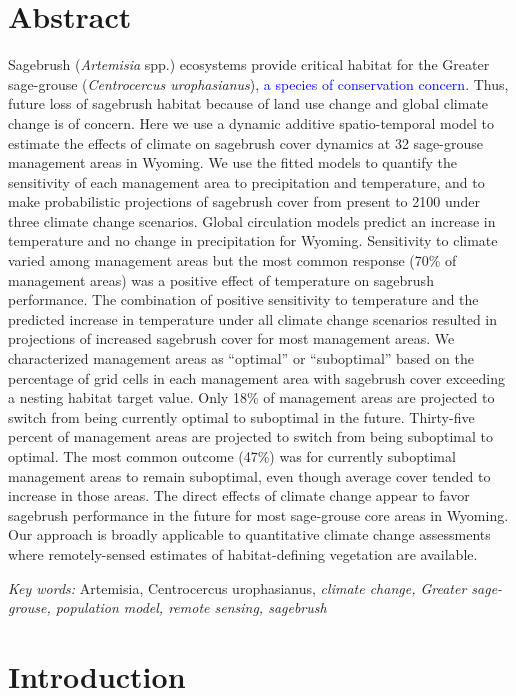\documentclass[
  12pt,
]{article}
\begin{document}
\newpage{}

\hypertarget{abstract}{%
\section{Abstract}\label{abstract}}

Sagebrush (\emph{Artemisia} spp.) ecosystems provide critical habitat for the Greater sage-grouse (\emph{Centrocercus urophasianus}), \textcolor{blue}{a species of conservation concern}.
Thus, future loss of sagebrush habitat because of land use change and global climate change is of concern.
Here we use a dynamic additive spatio-temporal model to estimate the effects of climate on sagebrush cover dynamics at 32 sage-grouse management areas in Wyoming.
We use the fitted models to quantify the sensitivity of each management area to precipitation and temperature, and to make probabilistic projections of sagebrush cover from present to 2100 under three climate change scenarios.
Global circulation models predict an increase in temperature and no change in precipitation for Wyoming.
Sensitivity to climate varied among management areas but the most common response (70\% of management areas) was a positive effect of temperature on sagebrush performance.
The combination of positive sensitivity to temperature and the predicted increase in temperature under all climate change scenarios resulted in projections of increased sagebrush cover for most management areas.
We characterized management areas as ``optimal'' or ``suboptimal'' based on the percentage of grid cells in each management area with sagebrush cover exceeding a nesting habitat target value.
Only 18\% of management areas are projected to switch from being currently optimal to suboptimal in the future.
Thirty-five percent of management areas are projected to switch from being suboptimal to optimal.
The most common outcome (47\%) was for currently suboptimal management areas to remain suboptimal, even though average cover tended to increase in those areas.
The direct effects of climate change appear to favor sagebrush performance in the future for most sage-grouse core areas in Wyoming.
Our approach is broadly applicable to quantitative climate change assessments where remotely-sensed estimates of habitat-defining vegetation are available.

\emph{Key words:} Artemisia, Centrocercus urophasianus, \emph{climate change, Greater sage-grouse, population model, remote sensing, sagebrush}

\hypertarget{introduction}{%
\section{Introduction}\label{introduction}}
\end{document}
